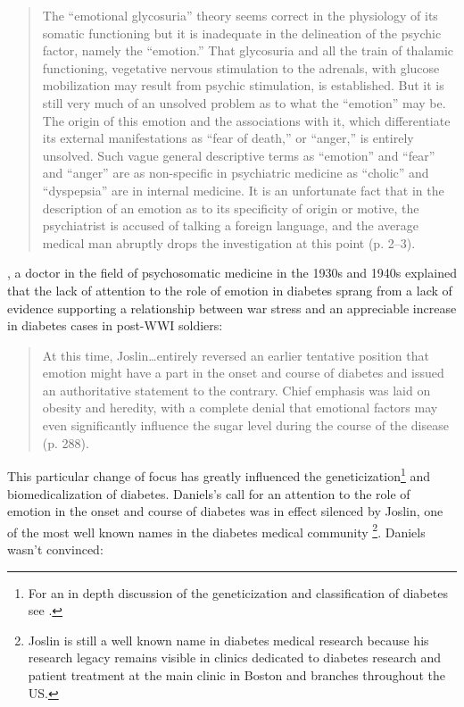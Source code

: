 \documentclass[12pt]{article}
\begin{document}
\begin{singlespace}
  \begin{quote}
The ``emotional glycosuria'' theory seems correct in the physiology of its somatic functioning but it is inadequate in the delineation of the psychic factor, namely the ``emotion.'' That glycosuria and all the train of thalamic functioning, vegetative nervous stimulation to the adrenals, with glucose mobilization may result from psychic stimulation, is established. But it is still very much of an unsolved problem as to what the ``emotion'' may be. The origin of this emotion and the associations with it, which differentiate its external manifestations as ``fear of death,'' or ``anger,'' is entirely unsolved. Such vague general descriptive terms as ``emotion'' and ``fear'' and ``anger'' are as non-specific in psychiatric medicine as ``cholic'' and ``dyspepsia'' are in internal medicine. It is an unfortunate fact that in the description of an emotion as to its specificity of origin or motive, the psychiatrist is accused of talking a foreign language, and the average medical man abruptly drops the investigation at this point (p. 2--3).
    \end{quote} 
\end{singlespace}

\citet{daniels_role_1948}, a doctor in the field of psychosomatic medicine in the 1930s and 1940s explained that the lack of attention to the role of emotion in diabetes sprang from a lack of evidence supporting a relationship between war stress and an appreciable increase in diabetes cases in post-WWI soldiers:

\begin{singlespace}
  \begin{quote}
  At this time, Joslin\dots entirely reversed an earlier tentative position that emotion might have a part in the onset and course of diabetes and issued an authoritative statement to the contrary. Chief emphasis was laid on obesity and heredity, with a complete denial that emotional factors may even significantly influence the sugar level during the course of the disease (p. 288).
  \end{quote} 
\end{singlespace} 

This particular change of focus has greatly influenced the geneticization\footnote{For an in depth discussion of the geneticization and classification of diabetes see \citet{hedgecoe_reinventing_2002}.} and biomedicalization of diabetes. Daniels's call for an attention to the role of emotion in the onset and course of diabetes was in effect silenced by Joslin, one of the most well known names in the diabetes medical community \footnote{Joslin is still a well known name in diabetes medical research because his research legacy remains visible in clinics dedicated to diabetes research and patient treatment at the main clinic in Boston and branches throughout the US.}. Daniels wasn't convinced: 
\end{document}

